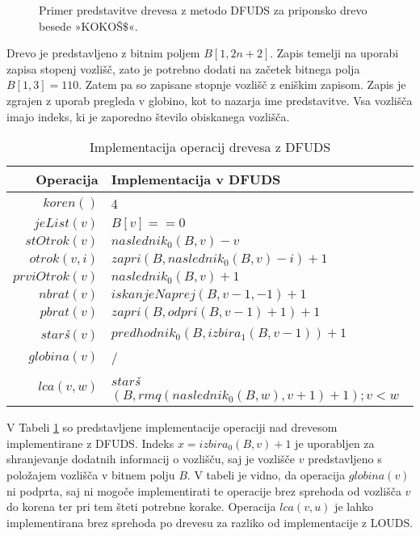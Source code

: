 \begin{figure}[htb]
    \begin{center}
        
        \caption{Primer predstavitve drevesa z metodo DFUDS za priponsko drevo besede »KOKOŠ$\$$«.} 
        \label{fig:DFUDS}
    \end{center}
\end{figure}

Drevo je predstavljeno z bitnim poljem $B[1,2n+2]$. Zapis temelji na uporabi zapisa stopenj vozlišč, zato je potrebno dodati na začetek bitnega polja $B[1,3]=110$. Zatem pa so zapisane stopnje vozlišč z eniškim zapisom. Zapis je zgrajen z uporab pregleda v globino, kot to nazarja ime predstavitve. Vsa vozlišča imajo indeks, ki je zaporedno število obiskanega vozlišča.

\begin{table}[htb]
    \centering
    \caption{Implementacija operacij drevesa z DFUDS}
    \begin{tabular}{r|l}
\textbf{Operacija}& \textbf{Implementacija v DFUD}S \\\hline
         $koren()$& 4\\
         $jeList(v)$& $B[v]==0$\\
         $stOtrok(v)$& $naslednik_0(B,v)-v$\\
         $otrok(v,i)$& $zapri(B, naslednik_0(B, v) - i)+1$\\
         $prviOtrok(v)$& $naslednik_0(B,v)+1$\\
         $nbrat(v)$& $iskanjeNaprej(B,v-1,-1)+1$ \\
         $pbrat(v)$& $zapri(B,odpri(B,v-1)+1)+1$ \\
         $star$\textit{š}$(v)$& $predhodnik_0(B,izbira_1(B,v-1))+1$ \\
         $globina(v)$& / \\
         $lca(v,w)$&  $star$\textit{š}$(B,rmq(naslednik_0(B,w),v+1)+1);v<w$\\

    \end{tabular}
    \label{tab:DFUDSop}
\end{table}

V Tabeli \ref{tab:DFUDSop} so predstavljene implementacije operaciji nad drevesom implementirane z DFUDS. Indeks  $x=izbira_0(B,v)+1$ je uporabljen za shranjevanje dodatnih informacij o vozlišču, saj je vozlišče $v$ predstavljeno s položajem vozlišča v bitnem polju $B$. V tabeli je vidno, da operacija $globina(v)$ ni podprta, saj ni mogoče implementirati te operacije brez sprehoda od vozlišča $v$ do korena ter pri tem šteti potrebne korake. Operacija $lca(v,u)$ je lahko implementirana brez sprehoda po drevesu za razliko od implementacije z LOUDS.

